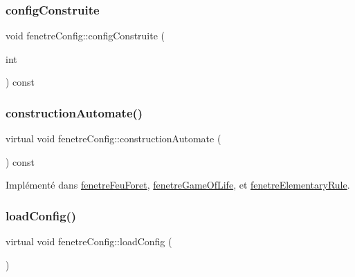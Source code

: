 \subsubsection{\texorpdfstring{config\+Construite}{configConstruite}}
{\footnotesize\ttfamily void fenetre\+Config\+::config\+Construite (\begin{DoxyParamCaption}\item[{int}]{ }\end{DoxyParamCaption}) const\hspace{0.3cm}{\ttfamily [signal]}}

\mbox{\label{classfenetre_config_a67e3561304b9c53dc01ae3f3b3713c11}} 
\subsubsection{\texorpdfstring{construction\+Automate()}{constructionAutomate()}}
{\footnotesize\ttfamily virtual void fenetre\+Config\+::construction\+Automate (\begin{DoxyParamCaption}{ }\end{DoxyParamCaption}) const\hspace{0.3cm}{\ttfamily [pure virtual]}}



Implémenté dans \mbox{\hyperlink{classfenetre_feu_foret_a41d2078bf781a32157d526f623a55b28}{fenetre\+Feu\+Foret}}, \mbox{\hyperlink{classfenetre_game_of_life_a76bc46f313a3d3b39ab060702de0b614}{fenetre\+Game\+Of\+Life}}, et \mbox{\hyperlink{classfenetre_elementary_rule_a37932a84243abfe789e6d18bdeb4324f}{fenetre\+Elementary\+Rule}}.

\mbox{\label{classfenetre_config_afab21d3c10c4b7779614da983e1e9bd5}} 
\subsubsection{\texorpdfstring{load\+Config()}{loadConfig()}}
{\footnotesize\ttfamily virtual void fenetre\+Config\+::load\+Config (\begin{DoxyParamCaption}{ }\end{DoxyParamCaption})\hspace{0.3cm}{\ttfamily [pure virtual]}}



